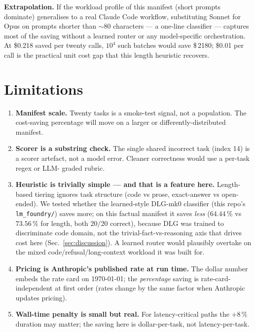 \documentclass[11pt,a4paper]{article}
\begin{document}
\textbf{Extrapolation.} If the workload profile of this manifest
(short prompts dominate) generalises to a real Claude Code workflow,
substituting Sonnet for Opus on prompts shorter than $\sim 80$
characters --- a one-line classifier --- captures most of the saving
without a learned router or any model-specific orchestration. At
\$0.218 saved per twenty calls, $10^4$ such batches would save
\$\,2180; \$0.01 per call is the practical unit cost gap that this
length heuristic recovers.

\section{Limitations}
\label{sec:limits}

\begin{enumerate}\itemsep0.3em
\item \textbf{Manifest scale.} Twenty tasks is a smoke-test signal,
      not a population. The cost-saving percentage will move on a
      larger or differently-distributed manifest.
\item \textbf{Scorer is a substring check.} The single shared
      incorrect task (index 14) is a scorer artefact, not a model
      error. Cleaner correctness would use a per-task regex or LLM-
      graded rubric.
\item \textbf{Heuristic is trivially simple --- and that is a
      feature here.} Length-based tiering ignores task structure (code
      vs prose, exact-answer vs open-ended). We tested whether the
      learned-style DLG-mk0 classifier (this repo's
      \texttt{lm\_foundry/}) saves more; on this factual manifest it
      saves \emph{less} ($64.44\,\%$ vs $73.56\,\%$ for length, both
      $20/20$ correct), because DLG was trained to discriminate code
      domain, not the trivial-fact-vs-reasoning axis that drives cost
      here (Sec.~\ref{sec:discussion}). A learned router would
      plausibly overtake on the mixed code/refusal/long-context
      workload it was built for.
\item \textbf{Pricing is Anthropic's published rate at run time.}
      The dollar number embeds the rate card on \today; the
      \emph{percentage} saving is rate-card-independent at first
      order (rates change by the same factor when Anthropic updates
      pricing).
\item \textbf{Wall-time penalty is small but real.} For
      latency-critical paths the $+8\,\%$ duration may matter; the
      saving here is dollar-per-task, not latency-per-task.
\end{enumerate}
\end{document}
